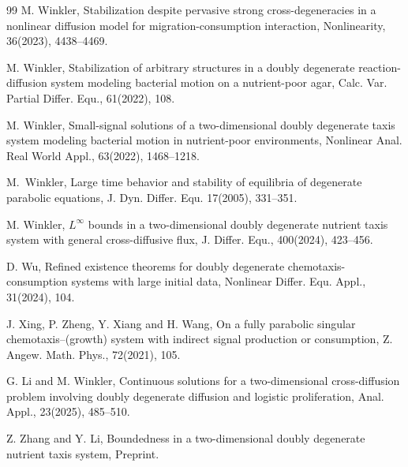 \documentclass[12pt]{article}
\theoremstyle{plain}
\theoremstyle{definition}
\numberwithin{equation}{section}
\begin{document}
\begin{thebibliography}{99}
M. Winkler, Stabilization despite pervasive strong cross-degeneracies in a nonlinear
diffusion model for migration-consumption interaction, Nonlinearity, 36(2023), 4438--4469.

 M. Winkler, Stabilization of arbitrary structures in a doubly degenerate reaction-diffusion system modeling bacterial motion
    on a nutrient-poor agar, Calc. Var. Partial Differ. Equ., 61(2022), 108.

 M. Winkler, Small-signal solutions of a two-dimensional doubly degenerate taxis system modeling bacterial motion in
    nutrient-poor environments, Nonlinear Anal. Real World Appl., 63(2022), 1468--1218.

M.~Winkler, Large time behavior and stability of equilibria of degenerate parabolic equations, J. Dyn. Differ. Equ. 17(2005), 331--351.


 M. Winkler, $L^{\infty}$ bounds in a two-dimensional doubly degenerate nutrient taxis system with general cross-diffusive flux, J. Differ. Equ., 400(2024), 423--456.



 D. Wu, Refined existence theorems for doubly degenerate chemotaxis-consumption systems with large initial data, Nonlinear Differ. Equ. Appl., 31(2024), 104.



J. Xing, P. Zheng, Y. Xiang and H. Wang, On a fully parabolic singular chemotaxis--(growth) system with indirect signal production or consumption, Z. Angew. Math. Phys.,  72(2021), 105.



G. Li and M. Winkler, Continuous solutions for a two-dimensional cross-diffusion problem involving doubly degenerate diffusion and logistic proliferation,  Anal. Appl., 23(2025), 485--510.

Z. Zhang and Y. Li, Boundedness in a two-dimensional doubly degenerate nutrient taxis system, Preprint.





\end{thebibliography}
\end{document}
